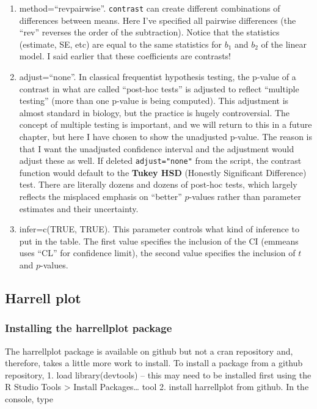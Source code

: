 \documentclass[]{book}
\providecommand{\tightlist}{%
  \setlength{\itemsep}{0pt}\setlength{\parskip}{0pt}}
\begin{document}
\begin{enumerate}
\def\labelenumi{\arabic{enumi}.}
\tightlist
\item
  method=``revpairwise''. \texttt{contrast} can create different
  combinations of differences between means. Here I've specified all
  pairwise differences (the ``rev'' reverses the order of the
  subtraction). Notice that the statistics (estimate, SE, etc) are equal
  to the same statistics for \(b_1\) and \(b_2\) of the linear model. I
  said earlier that these coefficients are contrasts!
\item
  adjust=``none''. In classical frequentist hypothesis testing, the
  p-value of a contrast in what are called ``post-hoc tests'' is
  adjusted to reflect ``multiple testing'' (more than one p-value is
  being computed). This adjustment is almost standard in biology, but
  the practice is hugely controversial. The concept of multiple testing
  is important, and we will return to this in a future chapter, but here
  I have chosen to show the unadjusted p-value. The reason is that I
  want the unadjusted confidence interval and the adjustment would
  adjust these as well. If deleted \texttt{adjust="none"} from the
  script, the contrast function would default to the \textbf{Tukey HSD}
  (Honestly Significant Difference) test. There are literally dozens and
  dozens of post-hoc tests, which largely reflects the misplaced
  emphasis on ``better'' \(p\)-values rather than parameter estimates
  and their uncertainty.
\item
  infer=c(TRUE, TRUE). This parameter controls what kind of inference to
  put in the table. The first value specifies the inclusion of the CI
  (emmeans uses ``CL'' for confidence limit), the second value specifies
  the inclusion of \(t\) and \(p\)-values.
\end{enumerate}

\subsection{Harrell plot}\label{harrell-plot}

\subsubsection{Installing the harrellplot
package}\label{installing-the-harrellplot-package}

The harrellplot package is available on github but not a cran repository
and, therefore, takes a little more work to install. To install a
package from a github repository, 1. load library(devtools) -- this may
need to be installed first using the R Studio Tools \textgreater{}
Install Packages\ldots{} tool 2. install harrellplot from github. In the
console, type
\end{document}
